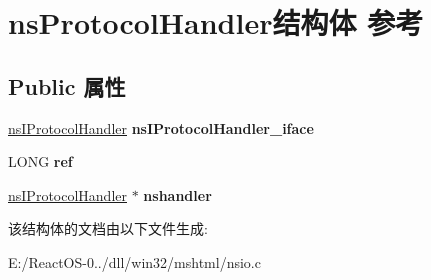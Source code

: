 \hypertarget{structns_protocol_handler}{}\section{ns\+Protocol\+Handler结构体 参考}
\label{structns_protocol_handler}
\subsection*{Public 属性}
\begin{DoxyCompactItemize}
\item 
\mbox{\label{structns_protocol_handler_a658d7c26afc96518753ebf90c8f1d0ff}} 
\hyperlink{interfacens_i_protocol_handler}{ns\+I\+Protocol\+Handler} {\bfseries ns\+I\+Protocol\+Handler\+\_\+iface}
\item 
\mbox{\label{structns_protocol_handler_aedc6cc8a65039d896635ddf9775c7bcc}} 
L\+O\+NG {\bfseries ref}
\item 
\mbox{\label{structns_protocol_handler_ab524585d82fe355f2860a450383eb232}} 
\hyperlink{interfacens_i_protocol_handler}{ns\+I\+Protocol\+Handler} $\ast$ {\bfseries nshandler}
\end{DoxyCompactItemize}


该结构体的文档由以下文件生成\+:\begin{DoxyCompactItemize}
\item 
E\+:/\+React\+O\+S-\/0../dll/win32/mshtml/nsio.\+c\end{DoxyCompactItemize}
